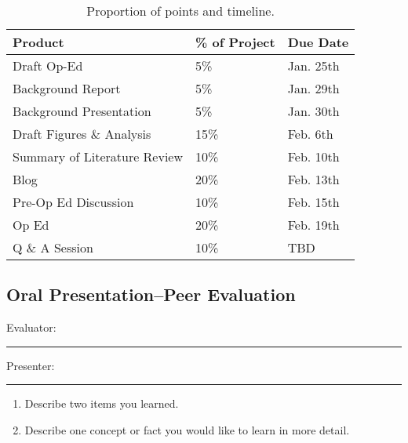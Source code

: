 \documentclass{article}\usepackage[]{graphicx}\usepackage[]{color}
\begin{document}
\begin{table}
\caption{Proportion of points and timeline.}
\begin{tabular}{lll}\hline
Product                     & \% of Project   & Due Date \\\hline\hline
Draft Op-Ed                 & 5\%             & Jan. 25th \\
Background Report           & 5\%             & Jan. 29th \\
Background Presentation     & 5\%             & Jan. 30th \\
Draft Figures \& Analysis   & 15\%            & Feb. 6th \\
Summary of Literature Review& 10\%            & Feb. 10th \\
Blog                        & 20\%            & Feb. 13th \\
Pre-Op Ed Discussion        & 10\%            & Feb. 15th \\     
Op Ed                       & 20\%            & Feb. 19th \\
Q \& A Session              & 10\%            & TBD \\ \hline

\end{tabular}
\end{table}

\clearpage
\newpage
\subsection{Oral Presentation--Peer Evaluation}

\bigskip
Evaluator: \rule{7cm}{0.4pt}

\bigskip

\noindent Presenter: \rule{7cm}{0.4pt}

\begin{enumerate}
 \setlength\itemsep{4em}
  \item Describe two items you learned.
  \item Describe one concept or fact you would like to learn in more detail.
\end{enumerate}
\end{document}
